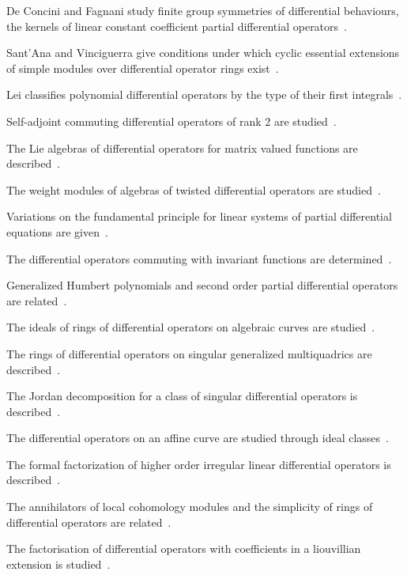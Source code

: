 De Concini and Fagnani study finite group symmetries of differential
behaviours, the kernels of linear constant coefficient partial differential
operators~\cite{WlSymmetriesOfDifferentialBehavi2020}.

Sant'Ana and Vinciguerra give conditions under which cyclic essential
extensions of simple modules over differential operator rings
exist~\cite{WlOnCyclicEssentialExtensionsOfS2020}.

Lei classifies polynomial differential operators by the type of their first
integrals~\cite{WlOnAClassificationOfPolynomialD2020}.

Self-adjoint commuting differential operators of rank 2 are
studied~\cite{WlSelfAdjointCommutingDifferenti2020}.

The Lie algebras of differential operators for matrix valued functions are
described~\cite{WlLieAlgebrasOfDifferentialOpera2020}.

The weight modules of algebras of twisted differential operators are
studied~\cite{WlOnWeightModulesOfAlgebrasOfTwi2020}.

Variations on the fundamental principle for linear systems of partial
differential equations are given~\cite{WlVariationsOnTheFundamentalPrin2020}.

The differential operators commuting with invariant functions are
determined~\cite{WlDifferentialOperatorsCommuting2020}.

Generalized Humbert polynomials and second order partial differential
operators are related~\cite{WlGeneralizedHumbertPolynomialsA2020}.

The ideals of rings of differential operators on algebraic curves are
studied~\cite{WlIdealsOfRingsOfDifferentialOpe2020}.

The rings of differential operators on singular generalized multiquadrics are
described~\cite{WlRingsOfDifferentialOperatorsOn2020}.

The Jordan decomposition for a class of singular differential operators is
described~\cite{WlJordanDecompositionForAClassOf2020}.

The differential operators on an affine curve are studied through ideal
classes~\cite{WlDifferentialOperatorsOnAnAffin2020}.

The formal factorization of higher order irregular linear differential
operators is described~\cite{WlFormalFactorizationOfHigherOrd2020}.

The annihilators of local cohomology modules and the simplicity of rings of
differential operators are
related~\cite{WlAnnihilatorsOfLocalCohomologyM2020}.

The factorisation of differential operators with coefficients in a liouvillian
extension is studied~\cite{WlFactorisationDOpRateursDiffRen2020}.
